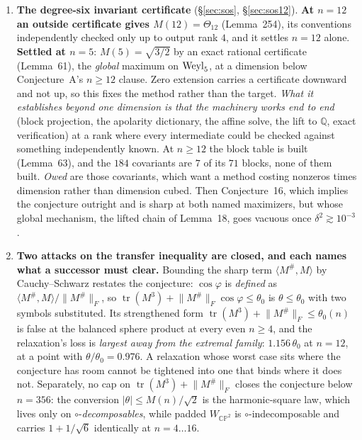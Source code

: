 \begin{enumerate}[leftmargin=1.8em]
\item \textbf{The degree-six invariant certificate} (\S\ref{sec:sos}, \S\ref{sec:sos12}). \textbf{At $n=12$ an outside certificate gives $M(12)=\Theta_{12}$} (Lemma~254), its conventions independently checked only up to output rank $4$, and it settles $n=12$ alone. \textbf{Settled at $n=5$}: $M(5)=\sqrt{3/2}$ by an exact rational certificate (Lemma~61), the \emph{global} maximum on $\mathrm{Weyl}_5$, at a dimension below Conjecture~A's $n\ge12$ clause. Zero extension carries a certificate downward and not up, so this fixes the method rather than the target. \emph{What it establishes beyond one dimension is that the machinery works end to end} (block projection, the apolarity dictionary, the affine solve, the lift to $\mathbb Q$, exact verification) at a rank where every intermediate could be checked against something independently known. At $n\ge12$ the block table is built (Lemma~63), and the $184$ covariants are $7$ of its $71$ blocks, none of them built. \emph{Owed} are those covariants, which want a method costing nonzeros times dimension rather than dimension cubed. Then Conjecture~16, which implies the conjecture outright and is sharp at both named maximizers, but whose global mechanism, the lifted chain of Lemma~18, goes vacuous once $\delta^2\gtrsim10^{-3}$.
\item \textbf{Two attacks on the transfer inequality are closed, and each names what a successor must clear.} Bounding the sharp term $\langle M^\#,M\rangle$ by Cauchy--Schwarz restates the conjecture: $\cos\varphi$ is \emph{defined} as $\langle M^\#,M\rangle/\lVert M^\#\rVert_F$, so $\operatorname{tr}(M^3)+\lVert M^\#\rVert_F\cos\varphi\le\theta_0$ is $\theta\le\theta_0$ with two symbols substituted. Its strengthened form $\operatorname{tr}(M^3)+\lVert M^\#\rVert_F\le\theta_0(n)$ is false at the balanced sphere product at every even $n\ge4$, and the relaxation's loss is \emph{largest away from the extremal family}: $1.156\,\theta_0$ at $n=12$, at a point with $\theta/\theta_0=0.976$. A relaxation whose worst case sits where the conjecture has room cannot be tightened into one that binds where it does not. Separately, no cap on $\operatorname{tr}(M^3)+\lVert M^\#\rVert_F$ closes the conjecture below $n=356$: the conversion $\lvert\theta\rvert\le M(n)/\sqrt2$ is the harmonic-square law, which lives only on $\circ$-\emph{decomposables}, while padded $W_{\mathbb{CP}^2}$ is $\circ$-indecomposable and carries $1+1/\sqrt6$ identically at $n=4\dots16$.


\end{enumerate}
